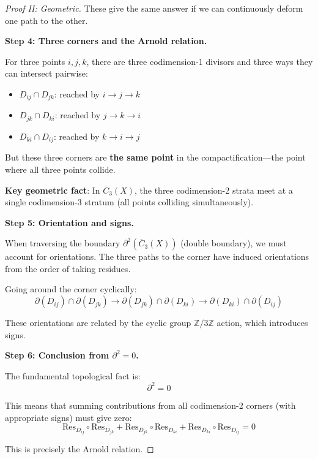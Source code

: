 \begin{proof}[Proof II: Geometric]
These give the same answer if we can continuously deform one path to the other.

\textbf{Step 4: Three corners and the Arnold relation.}

For three points $i, j, k$, there are three codimension-1 divisors and three ways they 
can intersect pairwise:
\begin{itemize}
\item $D_{ij} \cap D_{jk}$: reached by $i \to j \to k$
\item $D_{jk} \cap D_{ki}$: reached by $j \to k \to i$  
\item $D_{ki} \cap D_{ij}$: reached by $k \to i \to j$
\end{itemize}

But these three corners are \textbf{the same point} in the compactification---the point 
where all three points collide.

\textbf{Key geometric fact}: In $\overline{C}_3(X)$, the three codimension-2 strata 
meet at a single codimension-3 stratum (all points colliding simultaneously).

\textbf{Step 5: Orientation and signs.}

When traversing the boundary $\partial^2(\overline{C}_3(X))$ (double boundary), we must 
account for orientations. The three paths to the corner have induced orientations from 
the order of taking residues.

Going around the corner cyclically:
\begin{equation}
\partial(D_{ij}) \cap \partial(D_{jk}) \to \partial(D_{jk}) \cap \partial(D_{ki}) \to 
\partial(D_{ki}) \cap \partial(D_{ij})
\end{equation}

These orientations are related by the cyclic group $\mathbb{Z}/3\mathbb{Z}$ action, which 
introduces signs.

\textbf{Step 6: Conclusion from $\partial^2 = 0$.}

The fundamental topological fact is:
\begin{equation}
\partial^2 = 0
\end{equation}

This means that summing contributions from all codimension-2 corners (with appropriate 
signs) must give zero:
\begin{equation}
\text{Res}_{D_{ij}} \circ \text{Res}_{D_{jk}} + \text{Res}_{D_{jk}} \circ \text{Res}_{D_{ki}} 
+ \text{Res}_{D_{ki}} \circ \text{Res}_{D_{ij}} = 0
\end{equation}

This is precisely the Arnold relation. \qedhere
\end{proof}

